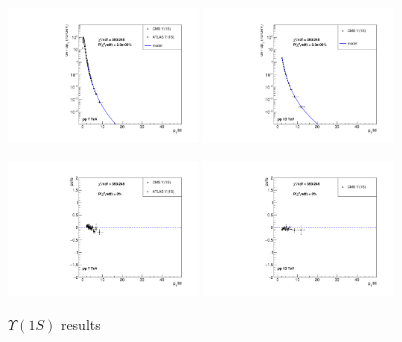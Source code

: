 \documentclass{article}
\begin{document}
\begin{figure}
\centering
\includegraphics[width = 0.45\textwidth]{ups1S_cs.pdf}
\includegraphics[width = 0.45\textwidth]{ups1S_cs_13.pdf}

\includegraphics[width = 0.45\textwidth]{ups1S_pull.pdf}
\includegraphics[width = 0.45\textwidth]{ups1S_pull_13.pdf}
\caption{$\Upsilon(1S)$ results}
\end{figure}

\clearpage
\end{document}

